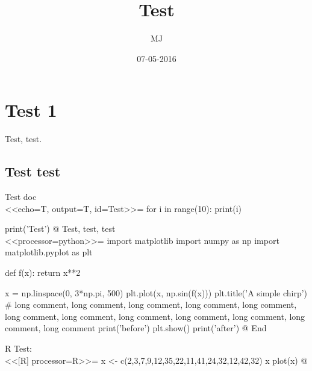 \documentclass{article}
\title{Test}
\date{07-05-2016}
\author{MJ}
\begin{document}
	\maketitle
	\newpage

	\section{Test 1}
	Test, test.

	\subsection{Test test}
	Test doc\\
	<<echo=T, output=T, id=Test>>=
for i in range(10):
    print(i)

print('Test')
    @
	Test, test, test\\
	<<processor=python>>=
import matplotlib
import numpy as np
import matplotlib.pyplot as plt

def f(x):
    return x**2

x = np.linspace(0, 3*np.pi, 500)
plt.plot(x, np.sin(f(x)))
plt.title('A simple chirp')
# long comment, long comment, long comment, long comment, long comment, long comment, long comment, long comment, long comment, long comment, long comment, long comment
print('before')
plt.show()
print('after')
    @
	End

	R Test:\\
<<[R] processor=R>>=
x <- c(2,3,7,9,12,35,22,11,41,24,32,12,42,32)
x
plot(x)
@
\end{document}
